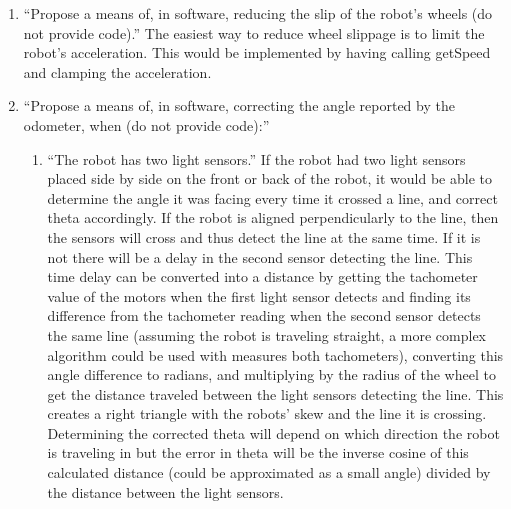 \documentclass[twocolumn]{article}
\begin{document}
\begin{enumerate}

\item ``Propose a means of, in software, reducing the slip of the robot's wheels (do not provide code).\cite{lab2}'' The easiest way to reduce wheel slippage is to limit the robot's acceleration. This would be implemented by having calling getSpeed and clamping the acceleration.

\item ``Propose a means of, in software, correcting the angle reported by the odometer, when (do not provide code):\cite{lab2}''

\begin{enumerate}
\item ``The robot has two light sensors.\cite{lab2}''
If the robot had two light sensors placed side by side on the front or back of the robot, it would be able to determine the angle it was facing every time it crossed a line, and correct theta accordingly. If the robot is aligned perpendicularly to the line, then the sensors will cross and thus detect the line at the same time. If it is not there will be a delay in the second sensor detecting the line. This time delay can be converted into a distance by getting the tachometer value of the motors when the first light sensor detects and finding its difference from the tachometer reading when the second sensor detects the same line (assuming the robot is traveling straight, a more complex algorithm could be used with measures both tachometers), converting this angle difference to radians, and multiplying by the radius of the wheel to get the distance traveled between the light sensors detecting the line. This creates a right triangle with the robots' skew and the line it is crossing. Determining the corrected theta will depend on which direction the robot is traveling in but the error in theta will be the inverse cosine of this calculated distance (could be approximated as a small angle) divided by the distance between the light sensors.


\end{enumerate}
\end{enumerate}
\end{document}
